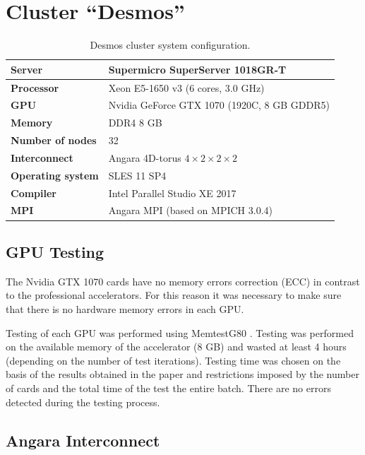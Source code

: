 \documentclass{llncs}
\begin{document}
\section{Cluster ``Desmos''}

\begin{table}[h]
\caption{\label{tab:systems}Desmos cluster system configuration.}
\begin{center}
\renewcommand{\arraystretch}{1}
\begin{tabular}{|p{33mm}|p{80mm}|}
\hline
\textbf{Server} & Supermicro SuperServer 1018GR-T\\
\hline
\textbf{Processor} & Xeon E5-1650 v3 (6 cores, 3.0 GHz)\\
\hline
\textbf{GPU} & Nvidia GeForce GTX 1070 (1920C, 8 GB GDDR5)\\
\hline
\textbf{Memory} & DDR4 8 GB\\
\hline
\textbf{Number of nodes} & 32\\
\hline
\textbf{Interconnect} & Angara 4D-torus $4\times2\times2\times2$\\
\hline
\textbf{Operating system} & SLES 11 SP4 \\
\hline
\textbf{Compiler} & Intel Parallel Studio XE 2017 \\
\hline
\textbf{MPI} & Angara MPI (based on MPICH 3.0.4)\\
\hline
\end{tabular}
\end{center}
\end{table}

\subsection{GPU Testing}
The Nvidia GTX 1070 cards have no memory errors correction
(ECC) in contrast to the professional accelerators. For this reason
it was necessary to make sure that there is no hardware memory errors in each GPU.


Testing of each GPU was performed using MemtestG80 \cite{Haque:2010:HDS:1844765.1845231}.
Testing was performed on the available memory of the accelerator (8 GB) and wasted at least
4 hours (depending on the number of test iterations). Testing time was chosen on the basis of the results obtained in the paper \cite{Kutzner2015BestBF} and restrictions 
imposed by the number of cards and the total time of the test the entire batch. There are no errors detected during the testing process.

\subsection{Angara Interconnect}
\end{document}
